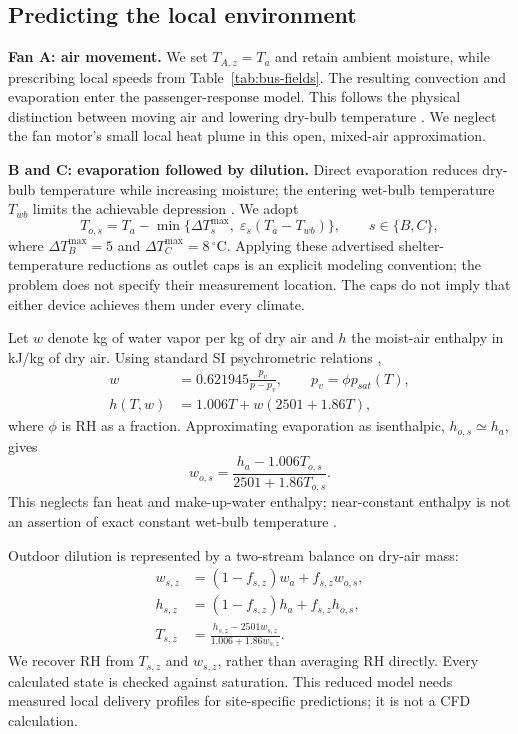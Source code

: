 \documentclass[12pt]{article}
\begin{document}
\clearpage
\subsection{Predicting the local environment}

\noindent\textbf{Fan A: air movement.} We set $T_{A,z}=T_a$ and retain ambient moisture, while prescribing local speeds from Table~\ref{tab:bus-fields}. The resulting convection and evaporation enter the passenger-response model. This follows the physical distinction between moving air and lowering dry-bulb temperature \cite{fanguide}. We neglect the fan motor's small local heat plume in this open, mixed-air approximation.

\noindent\textbf{B and C: evaporation followed by dilution.} Direct evaporation reduces dry-bulb temperature while increasing moisture; the entering wet-bulb temperature $T_{wb}$ limits the achievable depression \cite{evapequip}. We adopt
\begin{equation}
 T_{o,s}=T_a-\min\{\Delta T_s^{\max},\;\varepsilon_s(T_a-T_{wb})\},
 \qquad s\in\{B,C\},
\label{eq:outlet}
\end{equation}
where $\Delta T_B^{\max}=5$ and $\Delta T_C^{\max}=8\,^{\circ}\mathrm C$. Applying these advertised shelter-temperature reductions as outlet caps is an explicit modeling convention; the problem does not specify their measurement location. The caps do not imply that either device achieves them under every climate.

Let $w$ denote kg of water vapor per kg of dry air and $h$ the moist-air enthalpy in kJ/kg of dry air. Using standard SI psychrometric relations \cite{psychrolib},
\begin{align}
 w&=0.621945\frac{p_v}{p-p_v},\qquad p_v=\phi p_{sat}(T),\\
 h(T,w)&=1.006T+w(2501+1.86T),
\label{eq:enthalpy}
\end{align}
where $\phi$ is RH as a fraction. Approximating evaporation as isenthalpic, $h_{o,s}\simeq h_a$, gives
\begin{equation}
 w_{o,s}=\frac{h_a-1.006T_{o,s}}{2501+1.86T_{o,s}}.
\end{equation}
This neglects fan heat and make-up-water enthalpy; near-constant enthalpy is not an assertion of exact constant wet-bulb temperature \cite{evap}.

Outdoor dilution is represented by a two-stream balance on dry-air mass:
\begin{align}
 w_{s,z}&=(1-f_{s,z})w_a+f_{s,z}w_{o,s},\\
 h_{s,z}&=(1-f_{s,z})h_a+f_{s,z}h_{o,s},\\
 T_{s,z}&=\frac{h_{s,z}-2501w_{s,z}}{1.006+1.86w_{s,z}}.
\label{eq:mixing}
\end{align}
We recover RH from $T_{s,z}$ and $w_{s,z}$, rather than averaging RH directly. Every calculated state is checked against saturation. This reduced model needs measured local delivery profiles for site-specific predictions; it is not a CFD calculation.
\end{document}
